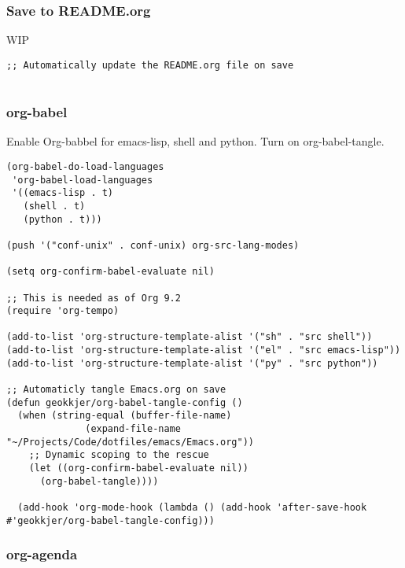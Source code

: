 \documentclass[11pt]{article}
\begin{document}
\subsubsection{Save to README.org}
\label{sec:org8e45838}
WIP
\begin{verbatim}
;; Automatically update the README.org file on save


\end{verbatim}

\subsubsection{org-babel}
\label{sec:org7d1a3a7}

Enable Org-babbel for emacs-lisp, shell and python. Turn on org-babel-tangle.

\begin{verbatim}
(org-babel-do-load-languages
 'org-babel-load-languages
 '((emacs-lisp . t)
   (shell . t)
   (python . t)))

(push '("conf-unix" . conf-unix) org-src-lang-modes)

(setq org-confirm-babel-evaluate nil)

;; This is needed as of Org 9.2
(require 'org-tempo)

(add-to-list 'org-structure-template-alist '("sh" . "src shell"))
(add-to-list 'org-structure-template-alist '("el" . "src emacs-lisp"))
(add-to-list 'org-structure-template-alist '("py" . "src python"))

;; Automaticly tangle Emacs.org on save
(defun geokkjer/org-babel-tangle-config ()
  (when (string-equal (buffer-file-name)
		      (expand-file-name "~/Projects/Code/dotfiles/emacs/Emacs.org"))
    ;; Dynamic scoping to the rescue
    (let ((org-confirm-babel-evaluate nil))
      (org-babel-tangle))))

  (add-hook 'org-mode-hook (lambda () (add-hook 'after-save-hook #'geokkjer/org-babel-tangle-config)))

\end{verbatim}

\subsubsection{org-agenda}
\label{sec:org01e79ef}
\end{document}
